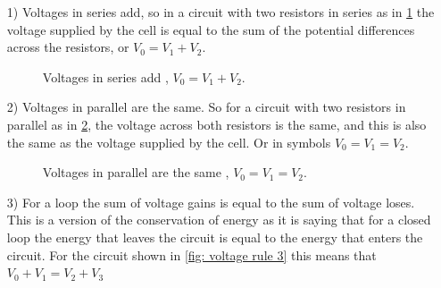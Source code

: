 \documentclass[a4paper,12pt]{book}
\begin{document}
\begin{itemize}
\setlength{\itemsep}{-5pt}
    \item[1)] Voltages in series add, so in a circuit with two resistors in series as in \cref{fig: voltage rule 1} the voltage supplied by the cell is equal to the sum of the potential differences across the resistors, or $V_{0}=V_{1}+V_{2}$.
     \begin{figure}[ht]
    \centering
    \caption{Voltages in series add , $V_{0}=V_{1}+V_{2}$.}
    \label{fig: voltage rule 1}
\end{figure}
    \item[2)] Voltages in parallel are the same. So for a circuit with two resistors in parallel as in \cref{fig: voltage rule 2}, the voltage across both resistors is the same, and this is also the same as the voltage supplied by the cell. Or in symbols $V_{0}=V_{1}=V_{2}$.
    \begin{figure}[ht]
    \centering
    \caption{Voltages in parallel are the same , $V_{0}=V_{1}=V_{2}$.}
    \label{fig: voltage rule 2}
\end{figure}
    \item[3)] For a loop the sum of voltage gains is equal to the sum of voltage loses. This is a version of the conservation of energy as it is saying that for a closed loop the energy that leaves the circuit is equal to the energy that enters the circuit. For the circuit shown in \cref{fig: voltage rule 3} this means that $V_{0}+V_{1}=V_{2}+V_{3}$
       \begin{figure}[ht]

\end{figure}
\end{itemize}
\end{document}
